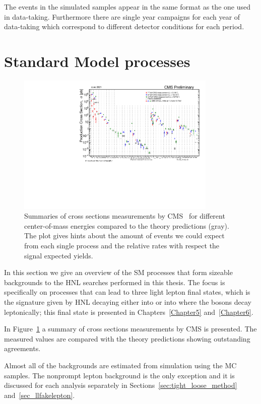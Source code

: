 The events in the simulated samples appear in the same format as the
one used in data-taking. Furthermore there are single year campaigns for
each year of data-taking which correspond to different detector
conditions for each period. 



\section{Standard Model processes}\label{sec:c4sm}
\begin{figure}[h]
\centering
  \includegraphics[width=0.85\textwidth]{Figures/c4/SigmaNew_v0.pdf}
  \caption{Summaries of cross sections measurements by CMS~\cite{cmspublic} for
    different center-of-mass energies compared to the theory
    predictions (gray). The plot gives hints about the
    amount of events we could expect from each single process and the
    relative rates with respect the signal expected yields.}
  \label{fig:crosssection}
\end{figure}
In this section we give an overview of the SM processes that form
sizeable backgrounds to the HNL searches performed in this thesis. The
focus is specifically on processes that can lead to three light
lepton final states, which is the
signature given by HNL decaying either into \PZ or into \PW where the bosons
decay leptonically; this final state is presented in
Chapters~\ref{Chapter5} and~\ref{Chapter6}.

In Figure~\ref{fig:crosssection} a summary of cross sections
measurements by CMS is presented. The measured values are compared
with the theory predictions showing outstanding agreements.

Almost all of the backgrounds are estimated from simulation using the
MC samples. The nonprompt lepton background is the only exception and it is
discussed for each analysis separately in Sections~\ref{sec:tight_loose_method}
and~\ref{sec_llfakelepton}. 

